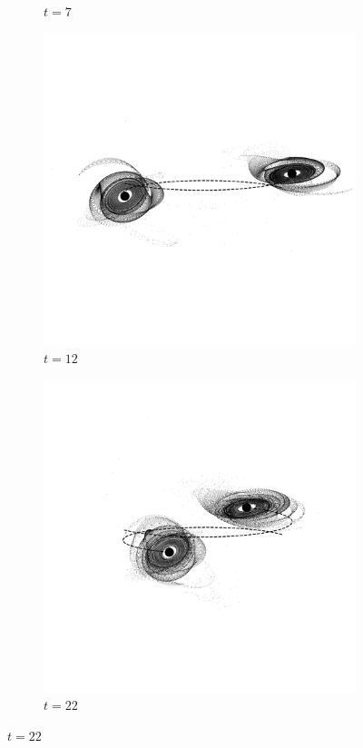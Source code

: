 \documentclass[11pt,twocolumn]{article}
\begin{document}
\begin{figure}[!tbp]
\begin{subfigure}[b]{0.45\textwidth}
    			\caption{$t = 7$}
  			\end{subfigure}
            \centering
            \begin{subfigure}[b]{0.9\textwidth}
    			\includegraphics[width=\textwidth, trim={0cm 5.5cm 0cm 5.5cm}, clip]{ngc5426/Ngc12_000000_115.pdf}
    			\caption{$t = 12$}
  			\end{subfigure}
			
            \begin{subfigure}[b]{0.9\textwidth}
\includegraphics[width=\textwidth, trim={0cm 5.5cm 0cm 4cm}, clip]{ngc5426/Ngc22_000000_115.pdf}
    			\caption{$t = 22$}
  			\end{subfigure}%
            

\end{figure}
\end{document}
